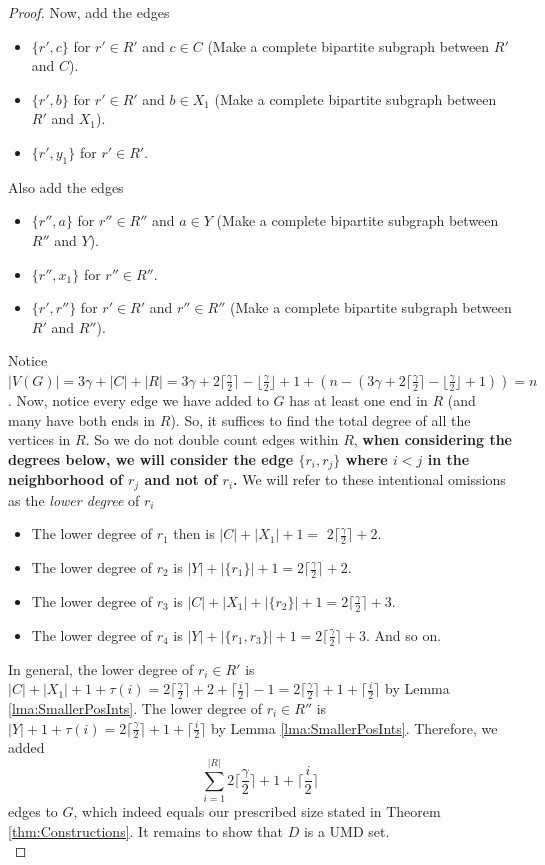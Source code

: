 \documentclass[12pt]{amsart}
\newcommand{\ceil}[1]{\lceil{#1}\rceil}
\begin{document}
\begin{proof}
Now, add the edges 
\begin{itemize}
    \item $\{r',c\}$ for $r' \in R'$ and $c \in C$ (Make a complete bipartite subgraph between $R'$ and $C$).
    \item $\{r',b\}$ for $r' \in R'$ and $b\in X_1$ (Make a complete bipartite subgraph between $R'$ and $X_1$).
    \item $\{r',y_1\}$ for $r' \in R'$.
\end{itemize}
Also add the edges
\begin{itemize}
    \item $\{r'', a\}$ for $r'' \in R''$ and $a \in Y$ (Make a complete bipartite subgraph between $R''$ and $Y$).
    \item $\{r'',x_1\}$ for $r'' \in R''$.
    \item $\{r',r''\}$ for $r' \in R'$ and $r'' \in R''$ (Make a complete bipartite subgraph between $R'$ and $R''$).
\end{itemize}
Notice $|V(G)| = 3\gamma + |C| + |R| = 3\gamma + 2 \lceil \frac{\gamma}{2} \rceil - \lfloor \frac{\gamma}{2}\rfloor+ 1 + (n - (3\gamma +2 \lceil \frac{\gamma}{2} \rceil - \lfloor \frac{\gamma}{2}\rfloor+ 1)) = n$. Now, notice every edge we have added to $G$ has at least one end in $R$ (and many have both ends in $R$). So, it suffices to find the total degree of all the vertices in $R$. So we do not double count edges within $R$, \textbf{when considering the degrees below, we will consider the edge $\{r_i,r_j\}$ where $i < j$ in the neighborhood of $r_j$ and not of $r_i$.} We will refer to these intentional omissions as the \textit{lower degree} of $r_i$
\begin{itemize}
    \item The lower degree of $r_1$ then is $|C| + |X_1| + 1 =$ $2\ceil{\frac{\gamma}{2}}+2$.
    \item The lower degree of $r_2$ is $|Y| + |\{r_1\}| + 1 = 2\ceil{\frac{\gamma}{2}}+2$.
    \item The lower degree of $r_3$ is $|C| + |X_1|+ |\{r_2\}| + 1 = 2\ceil{\frac{\gamma}{2}}+3$.
    \item The lower degree of $r_4$ is $|Y| + |\{r_1,r_3\}| + 1 = 2\ceil{\frac{\gamma}{2}}+3$. And so on.
\end{itemize}
In general, the lower degree of $r_i \in R'$ is $|C| + |X_1| + 1 + \tau(i) = 2\ceil{\frac{\gamma}{2}} + 2 + \ceil{\frac{i}{2}} - 1 = 2\ceil{\frac{\gamma}{2}} + 1 + \ceil{\frac{i}{2}}$ by Lemma \ref{lma:SmallerPosInts}. The lower degree of $r_i \in R''$ is $|Y| + 1 + \tau(i) =  2\ceil{\frac{\gamma}{2}} + 1 + \ceil{\frac{i}{2}}$ by Lemma \ref{lma:SmallerPosInts}. Therefore, we added $$\sum_{i=1}^{|R|}2\ceil{\frac{\gamma}{2}} + 1 + \ceil{\frac{i}{2}}$$ edges to $G$, which indeed equals our prescribed size stated in Theorem \ref{thm:Constructions}. It remains to show that $D$ is a UMD set.\\

\end{proof}
\end{document}

